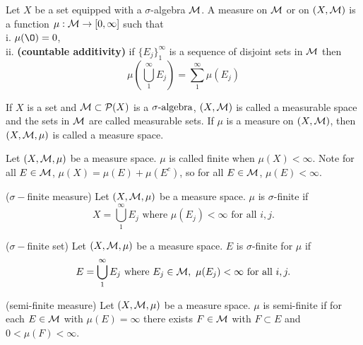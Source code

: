 %


\begin{dfn}[measure]
Let $X$ be a set equipped with a $\sigma$-algebra ${\mathcal M}$. A measure on ${\mathcal M}$	or on $(X, {\mathcal M})$ is a function $\mu: {\mathcal M} \rightarrow [0, \infty]$ such that \\
i. $\mu(\O)=0$,\\
ii. \textbf{(countable additivity)} if $\{E_j\}_1^\infty$ is a sequence of disjoint sets in ${\mathcal M}$ then \[
\mu\left( \bigcup_1^\infty E_j \right)=\sum_1^\infty \mu(E_j)
\]
\end{dfn}

\begin{dfn}
If $X$ is a set and ${\mathcal M} \subset \mathcal{P}(X)$ is a ${\sigma}\text{-algebra}$, $(X, {\mathcal M})$ is called a measurable space and the sets in ${\mathcal M}$ are called measurable sets. If $\mu$ is a measure on $(X, {\mathcal M})$, then $(X, {\mathcal M}, \mu)$ is called a measure space.
\end{dfn}



\begin{dfn} Let $(X, {\mathcal M}, \mu)$ be a measure space. $\mu$ is called finite when $\mu(X)< \infty$. Note for all $E\in {\mathcal M}$, $\mu(X)=\mu(E)+ \mu(E^c)$, so for all $E \in {\mathcal M}$, $\mu(E)< \infty$. \end{dfn}

\begin{dfn}($\sigma-$finite measure) Let $(X, {\mathcal M}, \mu)$ be a measure space. $\mu$ is $\sigma$-finite if
	\[ X = \bigcup_{1}^\infty E_j \text{ where } \mu(E_j)<\infty \text{ for all } i, j.
	\]
\end{dfn}
\begin{dfn}($\sigma-$finite set) Let $(X, {\mathcal M}, \mu)$ be a measure space. $E$ is $\sigma$-finite for $\mu$ if
	\[ E = \bigcup_{1}^\infty E_j \text{ where } E_j \in {\mathcal M}, \ \mu(E_j)<\infty \text{ for all } i, j.
	\]
\end{dfn}

\begin{dfn}(semi-finite measure) Let $(X, {\mathcal M}, \mu)$ be a measure space. $\mu$ is semi-finite if for each $E \in {\mathcal M}$ with $\mu(E)=\infty$ there exists $F \in {\mathcal M}$ with $F \subset E$ and $0< \mu(F)< \infty$.
\end{dfn}


